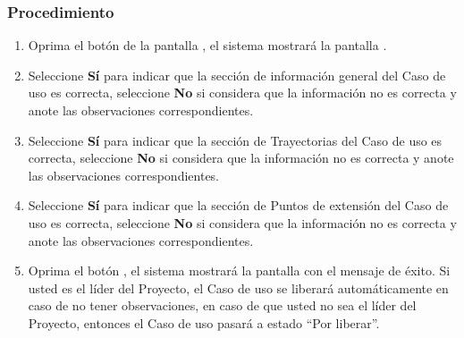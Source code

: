 \subsubsection{Procedimiento}
\begin{enumerate}
	\item Oprima el botón \btnRevisar de la pantalla , el sistema mostrará la pantalla . 

	 
	\item Seleccione \textbf{Sí} para indicar que la sección de información general del Caso de uso es correcta, seleccione \textbf{No} si considera que la información no es correcta y anote las observaciones correspondientes.
	
	\item Seleccione \textbf{Sí} para indicar que la sección de Trayectorias del Caso de uso es correcta, seleccione \textbf{No} si considera que la información no es correcta y anote las observaciones correspondientes.
	
	\item Seleccione \textbf{Sí} para indicar que la sección de Puntos de extensión del Caso de uso es correcta, seleccione \textbf{No} si considera que la información no es correcta y anote las observaciones correspondientes.
	
	\item Oprima el botón , el sistema mostrará la pantalla  con el mensaje de éxito. Si usted es el líder del Proyecto, el Caso de uso se liberará 
	automáticamente en caso de no tener observaciones, en caso de que usted no sea el líder del Proyecto, entonces el Caso de uso pasará a estado ``Por liberar''.
\end{enumerate}

